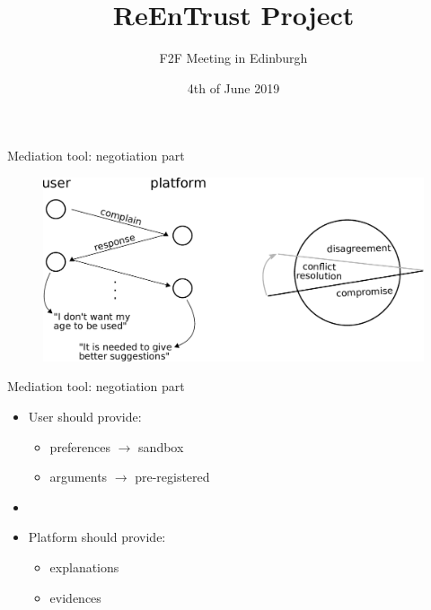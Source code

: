 \documentclass[t,french,mathserif]{beamer}
\title{\huge ReEnTrust Project}
\author{\Large F2F Meeting in Edinburgh}
\date{4th of June 2019}
\begin{document}
\begin{frame}[plain]
\titlepage
\end{frame}


\begin{frame}{Mediation tool: negotiation part}
    \vspace*{8mm}
    \begin{figure}
        \includegraphics[scale=0.4]{negotiation.pdf}
    \end{figure}
\end{frame}

\begin{frame}{Mediation tool: negotiation part}
    \begin{itemize}
        \item User should provide:
        \begin{itemize}
            \item preferences $\rightarrow$ sandbox
            \item arguments $\rightarrow$ pre-registered
        \end{itemize}
        \item[]
        \item Platform should provide:
        \begin{itemize}
            \item explanations
            \item evidences
        \end{itemize}
    \end{itemize}
\end{frame}
\end{document}
